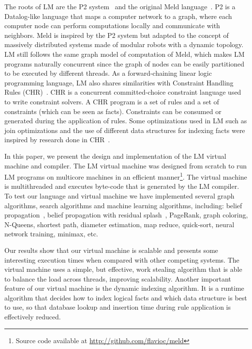 \documentclass{sigplanconf}
\begin{document}
The roots of LM are the P2 system~\cite{Loo-condie-garofalakis-p2} and
the original Meld
language~\cite{ashley-rollman-derosa-iros07wksp,ashley-rollman-iclp09}. P2
is a Datalog-like language that maps a computer network to a graph,
where each computer node can perform computations locally and
communicate with neighbors. Meld is inspired by the P2 system
but adapted to the concept of massively distributed systems made of
modular robots with a dynamic topology. LM still follows the same
graph model of computation of Meld, which makes LM programs naturally
concurrent since the graph of nodes can be easily partitioned to be
executed by different threads. As a forward-chaining linear logic
programming language, LM also shares similarities with Constraint
Handling Rules
(CHR)~\cite{Betz:2005kx,DBLP:journals/corr/abs-1006-3039}.  CHR is a
concurrent committed-choice constraint language used to write
constraint solvers. A CHR program is a set of rules and a set of
constraints (which can be seen as facts). Constraints can be consumed
or generated during the application of rules. Some optimizations
used in LM such as join optimizations and the use of different data
structures for indexing facts were inspired by research done in
CHR~\cite{DBLP:journals/corr/cs-PL-0408025}.

In this paper, we present the design and implementation of the LM virtual machine
and compiler.
The LM virtual machine was designed from scratch to run LM programs on
multicore machines in an efficient manner\footnote{Source code available at \url{http://github.com/flavioc/meld}}.
The virtual machine is multithreaded and executes byte-code that is generated
by the LM compiler. To test our language and virtual machine we have implemented several graph algorithms, search
algorithms and machine learning algorithms, including: belief
propagation~\cite{Gonzalez+al:aistats09paraml}, belief propagation
with residual splash~\cite{Gonzalez+al:aistats09paraml}, PageRank,
graph coloring, N-Queens, shortest path, diameter estimation, map
reduce, quick-sort, neural network training, minimax, etc.

Our results show that our virtual machine is scalable and presents some interesting
execution times when compared with other competing systems.
The virtual machine uses a simple, but effective, work stealing algorithm
that is able to balance the load across threads, improving scalability.
Another important feature of our virtual machine is the dynamic indexing algorithm.
It is a runtime algorithm that decides how to index logical facts and which
data structure is best to use, so that database lookup and insertion time during rule application
is effectively reduced.
\end{document}
